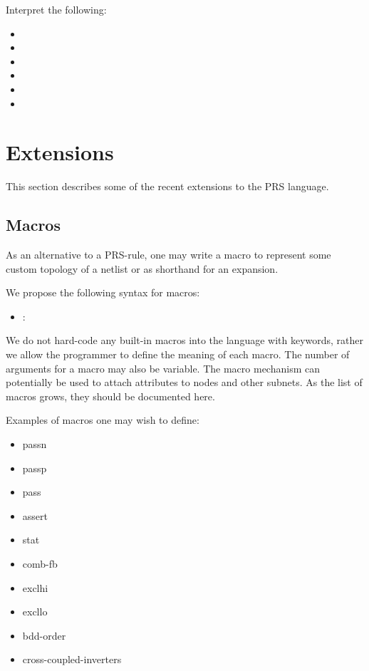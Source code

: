 Interpret the following:
\begin{itemize}
\item {}
\item {}
\item {}
\item {}
\item {}
\item {}
\end{itemize}

\section{Extensions}
\label{sec:prs:ext}

This section describes some of the recent extensions to the PRS language.  

\subsection{Macros}
\label{sec:prs:macros}

As an alternative to a PRS-rule, one may write a macro to represent
some custom topology of a netlist or as shorthand for an expansion.  

We propose the following syntax for macros:

\begin{itemize}
\item {} :  \ttt{(}  \ttt{)}
\end{itemize}

We do not hard-code any built-in macros into the language with keywords, 
rather we allow the programmer to define the meaning of each macro.  
The number of arguments for a macro may also be variable.  
The macro mechanism can potentially be used to attach attributes
to nodes and other subnets.  
As the list of macros grows, they should be documented here.  

Examples of macros one may wish to define:
\begin{itemize}
\item passn
\item passp
\item pass
\item assert
\item stat
\item comb-fb
\item exclhi
\item excllo
\item bdd-order
\item cross-coupled-inverters
\end{itemize}

